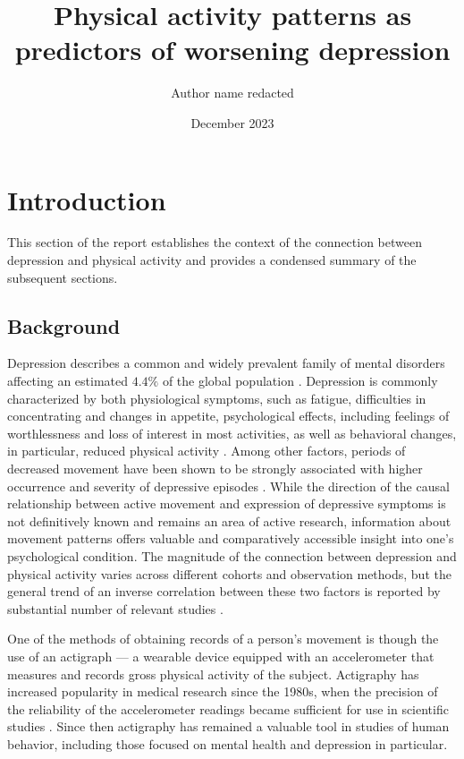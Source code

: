 \documentclass[12pt]{article}
\title{Physical activity patterns as predictors of worsening depression}
\author{Author name redacted}
\date{December 2023}
\begin{document}
\maketitle

\tableofcontents

\newpage

\section{Introduction}

This section of the report establishes the context of the connection between depression and physical activity and provides a condensed summary of the subsequent sections.

\subsection{Background}

Depression describes a common and widely prevalent family of mental disorders affecting an estimated $4.4\%$ of the global population \parencite{who}. Depression is commonly characterized by both physiological symptoms, such as fatigue, difficulties in concentrating and changes in appetite, psychological effects, including feelings of worthlessness and loss of interest in most activities, as well as behavioral changes, in particular, reduced physical activity \parencite{DSM5}. 
Among other factors, periods of decreased movement have been shown to be strongly associated with higher occurrence and severity of depressive episodes \parencite{O_Brien, Pinto, Harris}. While the direction of the causal relationship between active movement and expression of depressive symptoms is not definitively known and remains an area of active research, information about movement patterns offers valuable and comparatively accessible insight into one's psychological condition. The magnitude of the connection between depression and physical activity varies across different cohorts and observation methods, but the general trend of an inverse correlation between these two factors is reported by substantial number of relevant studies \parencite{Parker_Brotchie_1992}. 

One of the methods of obtaining records of a person's movement is though the use of an actigraph — a wearable device equipped with an accelerometer that measures and records gross physical activity of the subject. Actigraphy has increased popularity in medical research since the 1980s, when the precision of the reliability of the accelerometer readings became sufficient for use in scientific studies \parencite{Berger_2008}. Since then actigraphy has remained a valuable tool in studies of human behavior, including those focused on mental health and depression in particular.
\end{document}
